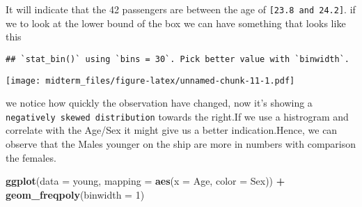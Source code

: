 \documentclass[]{article}
\newenvironment{Shaded}{\begin{snugshade}}{\end{snugshade}}
\newcommand{\CommentTok}[1]{\textcolor[rgb]{0.56,0.35,0.01}{\textit{#1}}}
\newcommand{\DataTypeTok}[1]{\textcolor[rgb]{0.13,0.29,0.53}{#1}}
\newcommand{\DecValTok}[1]{\textcolor[rgb]{0.00,0.00,0.81}{#1}}
\newcommand{\FloatTok}[1]{\textcolor[rgb]{0.00,0.00,0.81}{#1}}
\newcommand{\KeywordTok}[1]{\textcolor[rgb]{0.13,0.29,0.53}{\textbf{#1}}}
\newcommand{\NormalTok}[1]{#1}
\newcommand{\OperatorTok}[1]{\textcolor[rgb]{0.81,0.36,0.00}{\textbf{#1}}}
\newcommand{\StringTok}[1]{\textcolor[rgb]{0.31,0.60,0.02}{#1}}
\begin{document}
It will indicate that the 42 passengers are between the age of
\texttt{{[}23.8\ and\ 24.2{]}}. if we to look at the lower bound of the
box we can have something that looks like this

\begin{Shaded}
\end{Shaded}

\begin{verbatim}
## `stat_bin()` using `bins = 30`. Pick better value with `binwidth`.
\end{verbatim}

\texttt{[image: midterm\_files/figure-latex/unnamed-chunk-11-1.pdf]}

we notice how quickly the observation have changed, now it's showing a
\texttt{negatively\ skewed\ distribution} towards the right.If we use a
histrogram and correlate with the Age/Sex it might give us a better
indication.Hence, we can observe that the Males younger on the ship are
more in numbers with comparison the females.

\begin{Shaded}
\begin{Highlighting}[]
\KeywordTok{ggplot}\NormalTok{(}\DataTypeTok{data =}\NormalTok{ young, }\DataTypeTok{mapping =} \KeywordTok{aes}\NormalTok{(}\DataTypeTok{x =}\NormalTok{ Age, }\DataTypeTok{color =}\NormalTok{ Sex)) }\OperatorTok{+}
\StringTok{      }\KeywordTok{geom_freqpoly}\NormalTok{(}\DataTypeTok{binwidth =} \DecValTok{1}\NormalTok{)}
\end{Highlighting}
\end{Shaded}
\end{document}
